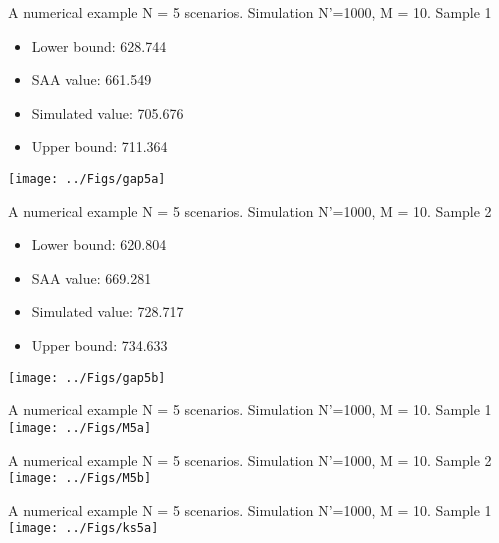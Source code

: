 \begin{frame}{A numerical example}
{N = 5 scenarios. Simulation N'=1000, M = 10. Sample 1}

\begin{itemize}
\item Lower bound: 628.744

\item SAA value:  661.549

\item Simulated value:  705.676

\item Upper bound:  711.364
\end{itemize}

\centering \texttt{[image: ../Figs/gap5a]}
\end{frame}

\begin{frame}{A numerical example}
{N = 5 scenarios. Simulation N'=1000, M = 10. Sample 2}

\begin{itemize}
\item Lower bound: 620.804

\item SAA value:  669.281

\item Simulated value:  728.717

\item Upper bound:  734.633
\end{itemize}

\centering \texttt{[image: ../Figs/gap5b]}
\end{frame}


\begin{frame}{A numerical example}
{N = 5 scenarios. Simulation N'=1000, M = 10. Sample 1}
\centering \texttt{[image: ../Figs/M5a]}
\end{frame}

\begin{frame}{A numerical example}
{N = 5 scenarios. Simulation N'=1000, M = 10. Sample 2}
\centering \texttt{[image: ../Figs/M5b]}
\end{frame}



\begin{frame}{A numerical example}
{N = 5 scenarios. Simulation N'=1000, M = 10. Sample 1}
\centering \texttt{[image: ../Figs/ks5a]}
\end{frame}

